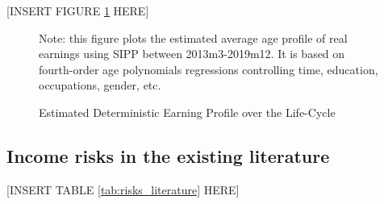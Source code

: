 \begin{center}
[INSERT FIGURE \ref{fig:life-cycle-determinstic} HERE]  
\end{center}

 \begin{figure}[!ht]
    	\caption{Estimated Deterministic Earning Profile over the Life-Cycle}
    	\label{fig:life-cycle-determinstic}
    	\begin{center}
    	\end{center}
    	\begin{flushleft}Note:  this figure plots the estimated average age profile of real earnings using SIPP between 2013m3-2019m12. It is based on fourth-order age polynomials regressions controlling time, education, occupations, gender, etc.\end{flushleft}
    \end{figure}
    
    
\subsection{Income risks in the existing literature}

\begin{center}
[INSERT TABLE \ref{tab:risks_literature} HERE]  
\end{center}

